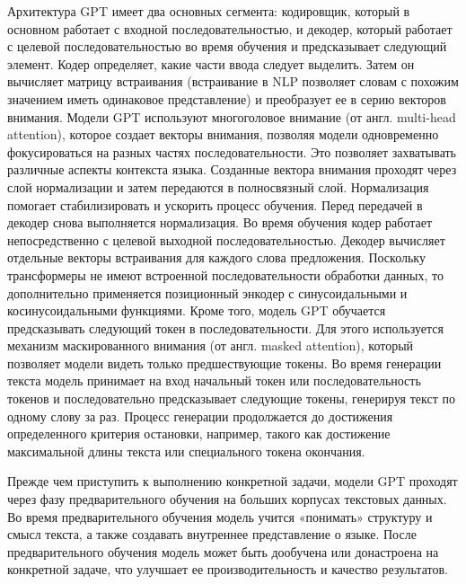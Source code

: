 \documentclass[a4paper,12pt]{extarticle}
\begin{document}
Архитектура GPT имеет два основных сегмента: кодировщик, который в основном работает с входной последовательностью, и декодер, который работает с целевой последовательностью во время обучения и предсказывает следующий элемент.  Кодер определяет, какие части ввода следует выделить. Затем он вычисляет матрицу встраивания (встраивание в NLP позволяет словам с похожим значением иметь одинаковое представление) и преобразует ее в серию векторов внимания. Модели  GPT используют многоголовое внимание (от англ. multi-head attention), которое создает векторы внимания, позволяя модели одновременно фокусироваться на разных частях последовательности. Это позволяет захватывать различные аспекты контекста языка. Созданные вектора внимания проходят через слой нормализации и затем передаются в полносвязный слой. Нормализация помогает стабилизировать и ускорить процесс обучения. Перед передачей в декодер снова выполняется нормализация. Во время обучения кодер работает непосредственно с целевой выходной последовательностью.  Декодер вычисляет отдельные векторы встраивания для каждого слова предложения. Поскольку трансформеры не имеют встроенной последовательности обработки данных, то дополнительно применяется позиционный энкодер с синусоидальными и косинусоидальными функциями. Кроме того, модель GPT обучается предсказывать следующий токен в последовательности. Для этого используется механизм маскированного внимания (от англ. masked attention), который позволяет модели видеть только предшествующие токены. Во время генерации текста модель принимает на вход начальный токен или последовательность токенов и последовательно предсказывает следующие токены, генерируя текст по одному слову за раз. Процесс генерации продолжается до достижения определенного критерия остановки, например, такого как достижение максимальной длины текста или специального токена окончания.

Прежде чем приступить к выполнению конкретной задачи, модели GPT проходят через фазу предварительного обучения на больших корпусах текстовых данных. Во время предварительного обучения модель учится «понимать» структуру и смысл текста, а также создавать внутреннее представление о языке. После предварительного обучения модель может быть дообучена или донастроена на конкретной задаче, что улучшает ее производительность и качество результатов.
\end{document}
